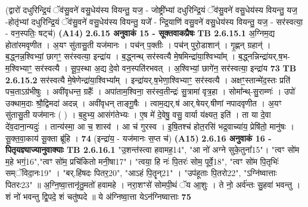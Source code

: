 \documentclass[17pt]{extarticle}
\begin{document}
                                (द्वारो॑ दधुरिन्द्रि॒यं ॅव॑सु॒वने॑ वसु॒धेय॑स्य वियन्तु॒ यज॒ - जोष्ट्री᳚भ्यां दधुरिन्द्रि॒यं ॅव॑सु॒वने॑ वसु॒धेय॑स्य वियन्तु॒ यज॒ -होतृ॑भ्यां दधुरिन्द्रि॒यं ॅव॑सु॒वने॑ वसु॒धेय॑स्य वियन्तु॒ यजे᳚ - न्द्रि॒याणि॑ वसु॒वने॑ वसु॒धेय॑स्य वियन्तु॒ यज॒ - सर॑स्वत्या॒ - वन॒स्पतिः॒ षट्च॑) \textbf{(A14)} \newline \newline
                \textbf{ 2.6.15    अनुवाकं   15 - सूक्तवाकप्रैषः} \newline
                                \textbf{ TB 2.6.15.1} \newline
                  अ॒ग्निम॒द्य होता॑रमवृणीत । अ॒यꣳ सु॑तासु॒ती यज॑मानः । पच॑न् प॒क्तीः । पच॑न् पुरो॒डाशान्॑ । गृ॒ह्णन् ग्रहान्॑ । ब॒द्ध्नन्न॒श्विभ्यां॒ छागꣳ॒॒ सर॑स्वत्या॒ इन्द्रा॑य । ब॒द्ध्नन्थ् सर॑स्वत्यै मे॒षमिन्द्रा॑या॒श्विभ्या᳚म् । ब॒द्ध्नन्निन्द्रा॑यर्.ष॒भ-म॒श्विभ्याꣳ॒॒ सर॑स्वत्यै । सू॒प॒स्था अ॒द्य दे॒वो वन॒स्पति॑रभवत् । अ॒श्विभ्यां॒ छागे॑न॒ सर॑स्वत्या॒ इन्द्रा॑य \textbf{ 73} \newline
                  \newline
                                \textbf{ TB 2.6.15.2} \newline
                  सर॑स्वत्यै मे॒षेणेन्द्रा॑या॒श्विभ्या᳚म् । इन्द्रा॑यर्.ष॒भेणा॒श्विभ्याꣳ॒॒ सर॑स्वत्यै । अक्षꣳ॒॒स्तान्मे॑द॒स्तः प्रति॑ पच॒ताऽग्र॑भीषुः । अवी॑वृधन्त॒ ग्रहैः᳚ । अपा॑ताम॒श्विना॒ सर॑स्व॒तीन्द्रः॑ सु॒त्रामा॑ वृत्र॒हा । सोमा᳚न्थ्-सु॒राम्णः॑ । उपो॑ उक्थाम॒दाः श्रौ॒द्विमदा॑ अदन्न् । अवी॑वृधन् ताङ्गू॒षैः । त्वाम॒द्यर्.ष॑ आर्.षेयर्.षीणां नपादवृणीत । अ॒यꣳ सु॑तासु॒ती यज॑मानः ( ) । ब॒हुभ्य॒ आसंग॑तेभ्यः । ए॒ष मे॑ दे॒वेषु॒ वसु॒ वार्या य॑क्ष्यत॒ इति॑ । ता या दे॒वा दे॑व॒दाना॒न्यदुः॑ । तान्य॑स्मा॒ आ च॒ शास्व॑ । आ च॑ गुरस्व । इ॒षि॒तश्च॑ होत॒रसि॑ भद्र॒वाच्या॑य॒ प्रेषि॑तो॒ मानु॑षः । सू॒क्त॒वा॒काय॑ सू॒क्ता ब्रू॑हि । \textbf{ 74} \newline
                  \newline
                                    (इन्द्रा॑य॒ - यज॑मानः स॒प्त च॑) \textbf{(A15)} \newline \newline
                \textbf{ 2.6.16    अनुवाकं   16 - पितृयज्ञ्याज्यानुवाक्याः} \newline
                                \textbf{ TB 2.6.16.1} \newline
                  "उ॒शन्त॑स्त्वा हवामह॒{14}", "आ नो॑ अग्ने सुके॒तुना᳚{15}"। "त्वꣳ सो॑म म॒हे भगं॒{16}","त्वꣳ सो॑म॒ प्रचि॑कितो मनी॒षा{17}"। "त्वया॒ हि नः॑ पि॒तरः॑ सोम॒ पूर्वे॒{18}", "त्वꣳ सो॑म पि॒तृभिः॑ सम्ॅविदा॒नः{19}" । "बर्.हि॑षदः पितर॒{20}", "आऽहं पि॒तॄन्{21}" । "उप॑हूताः पि॒तरो{22}", "ऽग्नि॑ष्वात्ताः पितरः{23}" ॥ अ॒ग्नि॒ष्वा॒त्तानृ॑तु॒मतो॑ हवामहे । नरा॒शꣳसे॑ सोमपी॒थं ॅय आ॒शुः । ते नो॒ अर्व॑न्तः सु॒हवा॑ भवन्तु । शं नो॑ भवन्तु द्वि॒पदे॒ शं चतु॑ष्पदे ॥ ये अ॑ग्निष्वा॒त्ता येऽन॑ग्निष्वात्ताः \textbf{ 75} \newline
\end{document}
